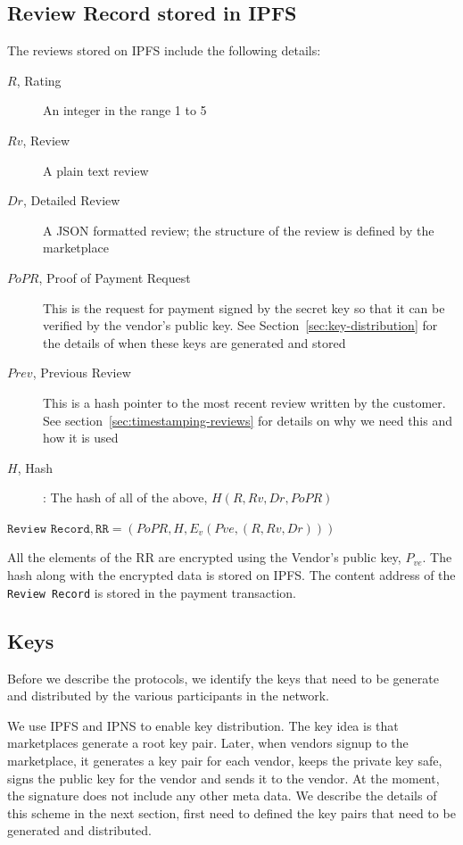 \documentclass[a4paper]{article}
\begin{document}
\subsection{Review Record stored in IPFS}\label{sec:review-record-stored}
  
The reviews stored on IPFS include the following details: 

\begin{description}
\item[$R$, Rating] An integer in the range 1 to 5
\item[$Rv$, Review] A plain text review
\item[$Dr$, Detailed Review] A JSON formatted review; the structure of
  the review is defined by the marketplace
\item[$PoPR$, Proof of Payment Request] This is the request for
  payment signed by the secret key so that it can be verified by the
  vendor's public key. See Section~\ref{sec:key-distribution} for the
  details of when these keys are generated and stored
\item[$Prev$, Previous Review] This is a hash pointer to the most
  recent review written by the customer. See
  section~\ref{sec:timestamping-reviews} for details on why we need
  this and how it is used
\item[$H$, Hash]: The hash of all of the above, $H(R, Rv, Dr, PoPR)$
\end{description}

$\texttt{Review Record}, \texttt{RR} = (PoPR, H, E_v(Pve, (R, Rv, Dr)))$

All the elements of the RR are encrypted using the Vendor's public key,
$P_{ve}$.  The hash along with the encrypted data is stored on IPFS\@. The
content address of the \texttt{Review Record} is stored in the payment
transaction.

\subsection{Keys}\label{sec:keys}

Before we describe the protocols, we identify the keys that need to be
generate and distributed by the various participants in the network.

We use IPFS and IPNS to enable key distribution. The key idea is that
marketplaces generate a root key pair. Later, when vendors signup to
the marketplace, it generates a key pair for each vendor, keeps the
private key safe, signs the public key for the vendor and sends it to
the vendor. At the moment, the signature does not include any other
meta data. We describe the details of this scheme in the next section,
first need to defined the key pairs that need to be generated and
distributed.
\end{document}
